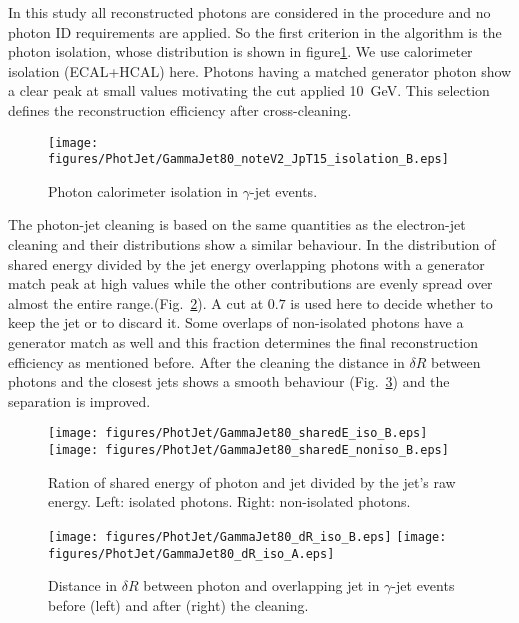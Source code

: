 \documentclass{cmspaper}
\begin{document}
In this study all reconstructed photons are considered in the procedure and no
photon ID requirements are applied. So the first criterion in the algorithm is
the photon isolation, whose distribution is shown in figure\ref{fig:pjPhotIso}. We use
calorimeter isolation (ECAL+HCAL) here. Photons having a matched generator
photon show a clear peak at small values motivating the cut applied 10\ GeV. This
selection defines the reconstruction efficiency after cross-cleaning.
\begin{figure}[hbtp]
  \begin{center}
    \texttt{[image: figures/PhotJet/GammaJet80\_noteV2\_JpT15\_isolation\_B.eps]}
    \caption{Photon calorimeter isolation in $\gamma$-jet events.}
    \label{fig:pjPhotIso}
  \end{center}
\end{figure}

The photon-jet cleaning is based on the same quantities as the electron-jet
cleaning and their distributions show a similar behaviour. In the distribution
of shared energy divided by the jet energy overlapping photons with a generator
match peak at high values while the other contributions are evenly spread over
almost the entire range.(Fig.~\ref{fig:pjSharedE}). A cut at $0.7$ is used
here to decide whether to keep the jet or to discard it. Some overlaps of
non-isolated photons have a generator match as well and this fraction
determines the final reconstruction efficiency as mentioned before. After the
cleaning the distance in $\delta R$ between photons and the closest jets shows
a smooth behaviour (Fig.~\ref{fig:pjDeltaR}) and the separation is improved. 
\begin{figure}[hbtp]
  \begin{center}
    \texttt{[image: figures/PhotJet/GammaJet80\_sharedE\_iso\_B.eps]}
    \texttt{[image: figures/PhotJet/GammaJet80\_sharedE\_noniso\_B.eps]}
    \caption{Ration of shared energy of photon and jet divided by the jet's raw
    energy. Left: isolated photons. Right: non-isolated photons.}
    \label{fig:pjSharedE}
  \end{center}
\end{figure}
\begin{figure}[hbtp]
  \begin{center}
    \texttt{[image: figures/PhotJet/GammaJet80\_dR\_iso\_B.eps]}
    \texttt{[image: figures/PhotJet/GammaJet80\_dR\_iso\_A.eps]}
    \caption{Distance in $\delta R$ between photon and overlapping jet in
    $\gamma$-jet events before (left) and after (right) the cleaning.}
    \label{fig:pjDeltaR}
  \end{center}
\end{figure}
\end{document}
